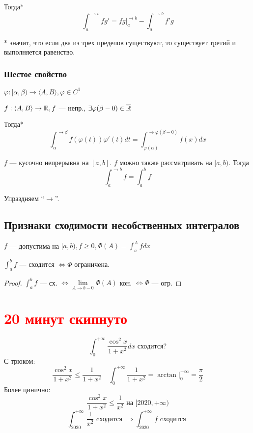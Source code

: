 Тогда* $$\int_a^{\rightarrow b} fg' = fg\Bigg|_a^{\rightarrow b} - \int_a^{\rightarrow b} f'g$$

* значит, что если два из трех  пределов существуют, то существует третий и выполняется равенство.

\subsubsection*{Шестое свойство}

$\varphi : [\alpha, \beta) \rightarrow \langle A, B\rangle, \varphi\in C^1$

$f : \langle A, B\rangle \rightarrow \mathbb{R}, f$ --- непр., $\exists \varphi(\beta-0)\in\overline {\mathbb{R}}$

Тогда*
$$\int_\alpha^{\rightarrow \beta} f(\varphi(t))\varphi'(t)dt = \int_{\varphi(\alpha)}^{\rightarrow \varphi(\beta-0)} f(x)dx$$

\begin{remark}
    $f$ --- кусочно непрерывна на $[a,b]$. $f$ можно также рассматривать на $[a, b)$. Тогда
    $$\int_a^{\rightarrow b} f = \int_a^b f$$
\end{remark}

Упраздняем ``$\rightarrow$''.

\subsection*{Признаки сходимости несобственных интегралов}

$f$ --- допустима на $[a, b), f\geq 0, \Phi(A) = \int_a^A fdx$

$\int_a^b f$ --- сходится $\Leftrightarrow \Phi$ ограничена.

\begin{proof}
    $\int_a^b f$ --- сх. $\Leftrightarrow \lim\limits_{A\to b-0} \Phi(A)$ кон. $\Leftrightarrow \Phi$ --- огр.
\end{proof}

\section*{\textcolor{red}{20 минут скипнуто}}

\begin{example}
    $$\int_0^{+\infty}\frac{\cos^2 x}{1+x^2}dx \text{ сходится?}$$
    С трюком:
    $$\frac{\cos^2 x}{1+x^2}\leq \frac{1}{1+x^2} \quad \int_0^{+\infty} \frac{1}{1+x^2}=\arctan\Bigg|_0^{+\infty}=\frac{\pi}{2}$$
    Более цинично:
    $$\frac{\cos^2 x}{1+x^2}\leq \frac{1}{x^2} \text{ на } [2020, +\infty)$$
    $$\int_{2020}^{+\infty} \frac{1}{x^2} \text{ cходится } \Rightarrow \int_{2020}^{+\infty} f \text{ cходится }$$
\end{example}


